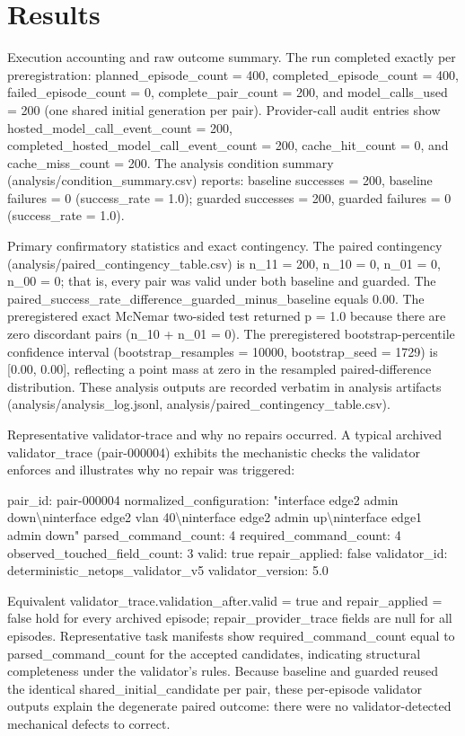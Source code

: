 \documentclass[conference]{IEEEtran}
\begin{document}
\section{Results}
Execution accounting and raw outcome summary. The run completed exactly per preregistration: planned\_episode\_count = 400, completed\_episode\_count = 400, failed\_episode\_count = 0, complete\_pair\_count = 200, and model\_calls\_used = 200 (one shared initial generation per pair). Provider-call audit entries show hosted\_model\_call\_event\_count = 200, completed\_hosted\_model\_call\_event\_count = 200, cache\_hit\_count = 0, and cache\_miss\_count = 200. The analysis condition summary (analysis/condition\_summary.csv) reports: baseline successes = 200, baseline failures = 0 (success\_rate = 1.0); guarded successes = 200, guarded failures = 0 (success\_rate = 1.0).

Primary confirmatory statistics and exact contingency. The paired contingency (analysis/paired\_contingency\_table.csv) is n\_11 = 200, n\_10 = 0, n\_01 = 0, n\_00 = 0; that is, every pair was valid under both baseline and guarded. The paired\_success\_rate\_difference\_guarded\_minus\_baseline equals 0.00. The preregistered exact McNemar two-sided test returned p = 1.0 because there are zero discordant pairs (n\_10 + n\_01 = 0). The preregistered bootstrap-percentile confidence interval (bootstrap\_resamples = 10000, bootstrap\_seed = 1729) is [0.00, 0.00], reflecting a point mass at zero in the resampled paired-difference distribution. These analysis outputs are recorded verbatim in analysis artifacts (analysis/analysis\_log.jsonl, analysis/paired\_contingency\_table.csv).

Representative validator-trace and why no repairs occurred. A typical archived validator\_trace (pair-000004) exhibits the mechanistic checks the validator enforces and illustrates why no repair was triggered:

pair\_id: pair-000004
  normalized\_configuration: "interface edge2 admin down\textbackslash{}ninterface edge2 vlan 40\textbackslash{}ninterface edge2 admin up\textbackslash{}ninterface edge1 admin down"
  parsed\_command\_count: 4
  required\_command\_count: 4
  observed\_touched\_field\_count: 3
  valid: true
  repair\_applied: false
  validator\_id: deterministic\_netops\_validator\_v5
  validator\_version: 5.0

Equivalent validator\_trace.validation\_after.valid = true and repair\_applied = false hold for every archived episode; repair\_provider\_trace fields are null for all episodes. Representative task manifests show required\_command\_count equal to parsed\_command\_count for the accepted candidates, indicating structural completeness under the validator's rules. Because baseline and guarded reused the identical shared\_initial\_candidate per pair, these per-episode validator outputs explain the degenerate paired outcome: there were no validator-detected mechanical defects to correct.
\end{document}

